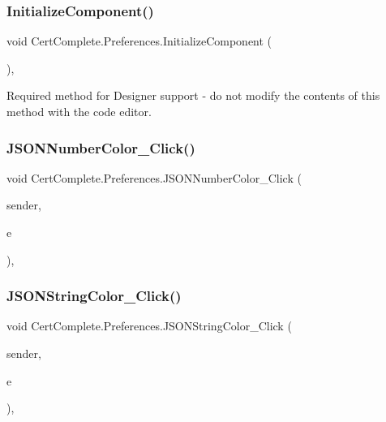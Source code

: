 \subsubsection{\texorpdfstring{Initialize\+Component()}{InitializeComponent()}}
{\footnotesize\ttfamily void Cert\+Complete.\+Preferences.\+Initialize\+Component (\begin{DoxyParamCaption}{ }\end{DoxyParamCaption})\hspace{0.3cm}{\ttfamily [inline]}, {\ttfamily [private]}}



Required method for Designer support -\/ do not modify the contents of this method with the code editor. 

\mbox{\label{class_cert_complete_1_1_preferences_ae642b7a6aa713898c440fbd9d71267ed}} 
\subsubsection{\texorpdfstring{J\+S\+O\+N\+Number\+Color\+\_\+\+Click()}{JSONNumberColor\_Click()}}
{\footnotesize\ttfamily void Cert\+Complete.\+Preferences.\+J\+S\+O\+N\+Number\+Color\+\_\+\+Click (\begin{DoxyParamCaption}\item[{object}]{sender,  }\item[{Event\+Args}]{e }\end{DoxyParamCaption})\hspace{0.3cm}{\ttfamily [inline]}, {\ttfamily [private]}}

\mbox{\label{class_cert_complete_1_1_preferences_a346e95d6b3579179169970a15806c641}} 
\subsubsection{\texorpdfstring{J\+S\+O\+N\+String\+Color\+\_\+\+Click()}{JSONStringColor\_Click()}}
{\footnotesize\ttfamily void Cert\+Complete.\+Preferences.\+J\+S\+O\+N\+String\+Color\+\_\+\+Click (\begin{DoxyParamCaption}\item[{object}]{sender,  }\item[{Event\+Args}]{e }\end{DoxyParamCaption})\hspace{0.3cm}{\ttfamily [inline]}, {\ttfamily [private]}}

